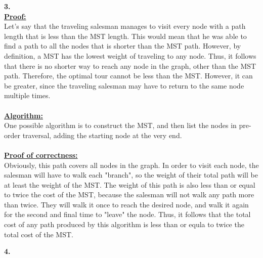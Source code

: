 \documentclass[10pt, letterpaper]{report}
\begin{document}
\newpage
\noindent \large{\textbf{3.} }\\
\textbf{\underline{Proof:}}\\
Let's say that the traveling salesman manages to visit every node with a path length that is less than the MST length. This would mean that he was able to find a path to all the nodes that is shorter than the MST path. However, by definition, a MST has the lowest weight of traveling to any node. Thus, it follows that there is no shorter way to reach any node in the graph, other than the MST path. Therefore, the optimal tour cannot be less than the MST. However, it can be greater, since the traveling salesman may have to return to the same node multiple times.\\
\\
\textbf{\underline{Algorithm:}}\\
One possible algorithm is to construct the MST, and then list the nodes in pre-order traversal, adding the starting node at the very end.\\
\\
\textbf{\underline{Proof of correctness:}}\\
Obviously, this path covers all nodes in the graph. In order to visit each node, the salesman will have to walk each "branch", so the weight of their total path will be at least the weight of the MST. The weight of this path is also less than or equal to twice the cost of the MST, because the salesman will not walk any path more than twice. They will walk it once to reach the desired node, and walk it again for the second and final time to "leave" the node. Thus, it follows that the total cost of any path produced by this algorithm is less than or equla to twice the total cost of the MST.

\newpage
\noindent \large{\textbf{4.} }
\end{document}
